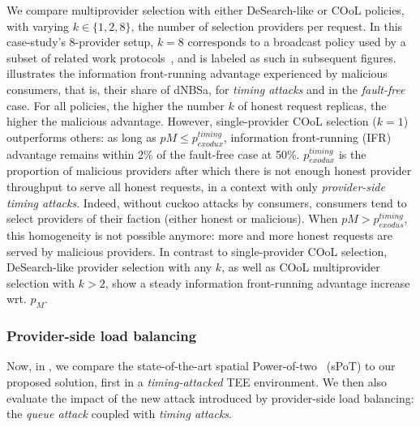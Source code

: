We compare multiprovider selection with either DeSearch-like or COoL policies, with varying $k\in \{1,2,8\}$, the number of selection providers per request.
In this case-study's 8-provider setup, $k=8$ corresponds to a broadcast policy used by a subset of related work protocols~\cite{stathakopoulouAddingFairnessOrder2021,kelkarThemisFastStrong2023}, and is labeled as such in subsequent figures.
 illustrates the information front-running advantage experienced by malicious consumers, that is, their share of dNBSa, for \emph{timing attacks} and in the \emph{fault-free} case.
For all policies, the higher the number $k$ of honest request replicas, the higher the malicious advantage.
However, single-provider COoL selection ($k=1$) outperforms others: as long as $p{M}\leq p_{exodux}^{timing}$, information front-running (IFR) advantage remains within 2\% of the fault-free case at 50\%. 
$p_{exodux}^{timing}$ is the proportion of malicious providers after which there is not enough honest provider throughput to serve all honest requests, in a context with only \emph{provider-side timing attacks}.
Indeed, without cuckoo attacks by consumers, consumers tend to select providers of their faction (either honest or malicious).
When $p{M}> p_{exodus}^{timing}$, this homogeneity is not possible anymore: more and more honest requests are served by malicious providers.
In contrast to single-provider COoL selection, DeSearch-like provider selection with any $k$, as well as COoL multiprovider selection with $k>2$, show a steady information front-running advantage increase wrt. $p_{M}$.

\subsubsection{Provider-side load balancing}\label{ssec:res-spot}

Now, in , we compare the state-of-the-art spatial Power-of-two~\cite{panigrahyAnalysisEvaluationProximitybased2022} (sPoT) to our proposed solution, first in a \emph{timing-attacked} TEE environment. 
We then also evaluate the impact of the new attack introduced by provider-side load balancing: the \emph{queue attack} coupled with \emph{timing attacks}.

